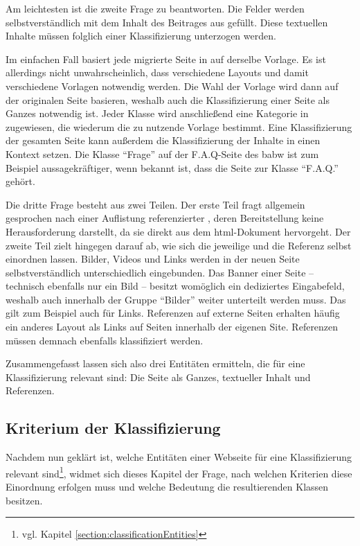        Am leichtesten ist die zweite Frage zu beantworten.
        Die Felder werden selbstverständlich mit dem Inhalt des Beitrages
        aus {\wordpress} gefüllt.
        Diese textuellen Inhalte müssen folglich einer Klassifizierung unterzogen werden.
        
        Im einfachen Fall basiert jede migrierte Seite in {\imperia} auf derselbe Vorlage.
        Es ist allerdings nicht unwahrscheinlich,
        dass verschiedene Layouts und damit verschiedene Vorlagen
        notwendig werden.
        Die Wahl der Vorlage wird dann auf der originalen Seite basieren,
        weshalb auch die Klassifizierung einer Seite als Ganzes notwendig ist.
        Jeder Klasse wird anschließend eine Kategorie in {\imperia}
        zugewiesen, die wiederum die zu nutzende Vorlage bestimmt.
        Eine Klassifizierung der gesamten Seite kann außerdem die
        Klassifizierung der Inhalte in einen Kontext setzen.
        Die Klasse "`Frage"' auf der F.A.Q-Seite des \gls{babw}
        ist zum Beispiel aussagekräftiger, wenn bekannt ist,
        dass die Seite zur Klasse "`F.A.Q."' gehört.

        Die dritte Frage besteht aus zwei Teilen.
        Der erste Teil fragt allgemein gesprochen nach einer Auflistung referenzierter {\resources},
        deren Bereitstellung keine Herausforderung darstellt,
        da sie direkt aus dem \gls{html}-Dokument hervorgeht.
        Der zweite Teil zielt hingegen darauf ab,
        wie sich die jeweilige {\resource} und die Referenz selbst einordnen lassen.
        Bilder, Videos und Links werden in der neuen Seite selbstverständlich
        unterschiedlich eingebunden.
        Das Banner einer Seite -- technisch ebenfalls nur ein Bild --
        besitzt womöglich ein dediziertes Eingabefeld,
        weshalb auch innerhalb der Gruppe "`Bilder"' weiter unterteilt werden muss.
        Das gilt zum Beispiel auch für Links.
        Referenzen auf externe Seiten erhalten häufig ein anderes Layout als Links
        auf Seiten innerhalb der eigenen Site.
        Referenzen müssen demnach ebenfalls klassifiziert werden.

        Zusammengefasst lassen sich also drei Entitäten ermitteln,
        die für eine Klassifizierung relevant sind:
        Die Seite als Ganzes, textueller Inhalt und Referenzen.

    \subsection{Kriterium der Klassifizierung}
        \label{section:ClassificationCriteria}
        Nachdem nun geklärt ist, welche Entitäten einer Webseite für
        eine Klassifizierung relevant sind\footnote{vgl. Kapitel \ref{section:classificationEntities}},
        widmet sich dieses Kapitel der Frage, nach welchen
        Kriterien diese Einordnung erfolgen muss
        und welche Bedeutung die resultierenden Klassen besitzen.

